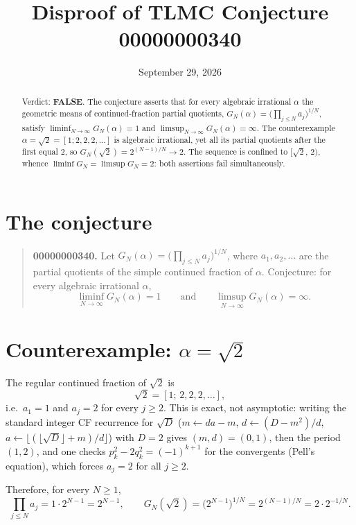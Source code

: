 \documentclass[11pt]{article}
\title{Disproof of TLMC Conjecture 00000000340}
\date{September 29, 2026}
\begin{document}
\maketitle

\begin{abstract}
Verdict: \textbf{FALSE}. The conjecture asserts that for every algebraic irrational
$\alpha$ the geometric means of continued-fraction partial quotients,
$G_N(\alpha)=\bigl(\prod_{j\le N} a_j\bigr)^{1/N}$, satisfy
$\liminf_{N\to\infty} G_N(\alpha)=1$ and $\limsup_{N\to\infty}G_N(\alpha)=\infty$.
The counterexample $\alpha=\sqrt2=[1;2,2,2,\dots]$ is algebraic irrational, yet all its
partial quotients after the first equal $2$, so
$G_N(\sqrt2)=2^{(N-1)/N}\to 2$. The sequence is confined to $[\sqrt2,\,2)$, whence
$\liminf G_N=\limsup G_N=2$: both assertions fail simultaneously.
\end{abstract}

\section{The conjecture}

\begin{quote}
\textbf{00000000340.} Let $G_N(\alpha)=\bigl(\prod_{j\le N}a_j\bigr)^{1/N}$, where
$a_1,a_2,\dots$ are the partial quotients of the simple continued fraction of $\alpha$.
Conjecture: for every algebraic irrational $\alpha$,
\[
\liminf_{N\to\infty}G_N(\alpha)=1
\qquad\text{and}\qquad
\limsup_{N\to\infty}G_N(\alpha)=\infty .
\]
\end{quote}

\section{Counterexample: $\alpha=\sqrt2$}

The regular continued fraction of $\sqrt2$ is
\[
\sqrt2=[1;\,2,2,2,\dots],
\]
i.e.\ $a_1=1$ and $a_j=2$ for every $j\ge 2$. This is exact, not asymptotic: writing the
standard integer CF recurrence for $\sqrt D$ ($m\leftarrow da-m$, $d\leftarrow (D-m^2)/d$,
$a\leftarrow\lfloor(\lfloor\sqrt D\rfloor+m)/d\rfloor$) with $D=2$ gives $(m,d)=(0,1)$, then the
period $(1,2)$, and one checks $p_k^2-2q_k^2=(-1)^{k+1}$ for the convergents (Pell's equation),
which forces $a_j=2$ for all $j\ge2$.

Therefore, for every $N\ge1$,
\[
\prod_{j\le N}a_j = 1\cdot 2^{N-1}=2^{N-1},
\qquad
G_N(\sqrt2)=\bigl(2^{N-1}\bigr)^{1/N}=2^{(N-1)/N}=2\cdot 2^{-1/N}.
\]
\end{document}
